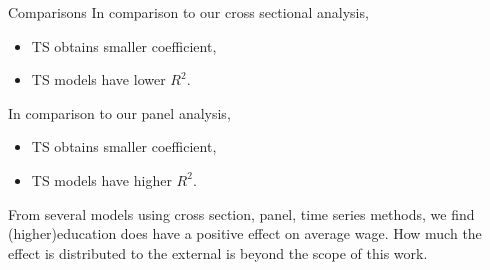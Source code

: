 \documentclass[compress]{beamer}
\begin{document}
\begin{frame}{Comparisons}
  In comparison to our cross sectional analysis,
  \begin{itemize}
    \item TS obtains smaller coefficient,
    \item TS models have lower $R^2$.
  \end{itemize}
  In comparison to our panel analysis,
  \begin{itemize}
    \item TS obtains smaller coefficient,
    \item TS models have higher $R^2$.
  \end{itemize}
  From several models using cross section, panel, time series methods, we find (higher)education does have a positive effect
  on average wage. How much the effect is distributed to the external is beyond the scope of this work.
\end{frame}
\end{document}
